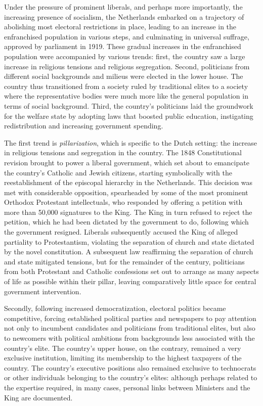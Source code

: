 Under the pressure of prominent liberals, and perhaps more importantly, the increasing presence of socialism, the Netherlands embarked on a trajectory of abolishing most electoral restrictions in place, leading to an increase in the enfranchised population in various steps, and culminating in universal suffrage, approved by parliament in 1919. These gradual increases in the enfranchised population were accompanied by various trends: first, the country saw a large increase in religious tensions and religious segregation. Second, politicians from different social backgrounds and milieus were elected in the lower house. The country thus transitioned from a society ruled by traditional elites to a society where the representative bodies were much more like the general population in terms of social background. Third, the country's politicians laid the groundwork for the welfare state by adopting laws that boosted public education, instigating redistribution and increasing government spending. 

The first trend is \textit{pillarization}, which is specific to the Dutch setting: the increase in religious tensions and segregation in the country. The 1848 Constitutional revision brought to power a liberal government, which set about to emancipate the country's Catholic and Jewish citizens, starting symbolically with the reestablishment of the episcopal hierarchy in the Netherlands. This decision was met with considerable opposition, spearheaded by some of the most prominent Orthodox Protestant intellectuals, who responded by offering a petition with more than 50,000 signatures to the King. The King in turn refused to reject the petition, which he had been dictated by the government to do, following which the government resigned. \autocite{oud1961honderd} Liberals subsequently accused the King of alleged partiality to Protestantism, violating the separation of church and state dictated by the novel constitution. A subsequent law reaffirming the separation of church and state mitigated tensions, but for the remainder of the century, politicians from both Protestant and Catholic confessions set out to arrange as many aspects of life as possible within their pillar, leaving comparatively little space for central government intervention. \autocite{van2013eerste}

Secondly, following increased democratization, electoral politics became competitive, forcing established political parties and newspapers to pay attention not only to incumbent candidates and politicians from traditional elites, but also to newcomers with political ambitions from backgrounds less associated with the country's elite. The country's upper house, on the contrary, remained a very exclusive institution, limiting its membership to the highest taxpayers of the country. The country's executive positions also remained exclusive to technocrats or other individuals belonging to the country's elites: although perhaps related to the expertise required, in many cases, personal links between Ministers and the King are documented. \autocite{secker1991ministers}


